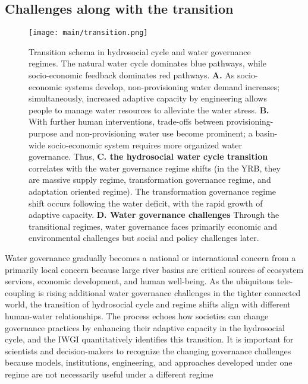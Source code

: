 \subsection{Challenges along with the transition}

\begin{figure*}[htbp!]
	\centering
	\texttt{[image: main/transition.png]}
	\caption{
		Transition schema in hydrosocial cycle and water governance regimes. The natural water cycle dominates blue pathways, while socio-economic feedback dominates red pathways.
		\textbf{A.} As socio-economic systems develop, non-provisioning water demand increases; simultaneously, increased adaptive capacity by engineering allows people to manage water resources to alleviate the water stress.
		\textbf{B.} With further human interventions, trade-offs between provisioning-purpose and non-provisioning water use become prominent; a basin-wide socio-economic system requires more organized water governance.
		Thus, \textbf{C. the hydrosocial water cycle transition} correlates with the water governance regime shifts (in the YRB, they are massive supply regime, transformation governance regime, and adaptation oriented regime). The transformation governance regime shift occurs following the water deficit, with the rapid growth of adaptive capacity.
		\textbf{D. Water governance challenges} Through the transitional regimes, water governance faces primarily economic and environmental challenges but social and policy challenges later.
	}
	\label{fig:summary}
\end{figure*}

Water governance gradually becomes a national or international concern from a primarily local concern because large river basins are critical sources of ecosystem services, economic development, and human well-being.
As the ubiquitous tele-coupling is rising additional water governance challenges in the tighter connected world, the transition of hydrosocial cycle and regime shifts align with different human-water relationships.
The process echoes how societies can change governance practices by enhancing their adaptive capacity in the hydrosocial cycle, and the IWGI quantitatively identifies this transition.
It is important for scientists and decision-makers to recognize the changing governance challenges because models, institutions, engineering, and approaches developed under one regime are not necessarily useful under a different regime

